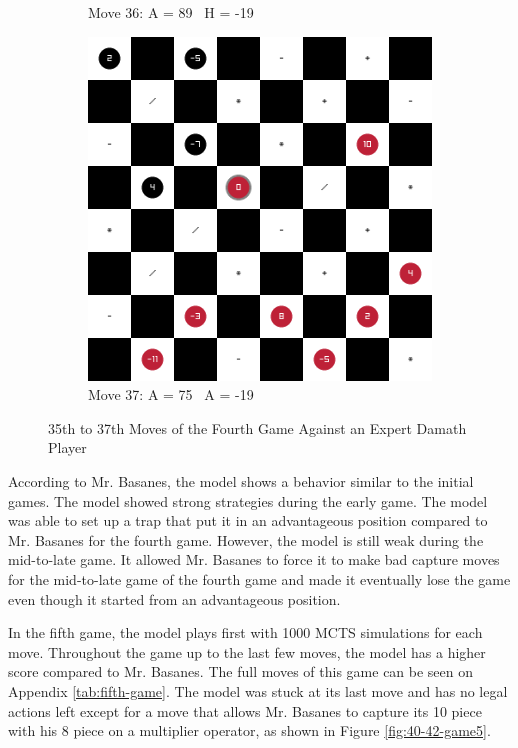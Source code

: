 \begin{figure}[H]
\begin{subfigure}{0.3\textwidth}
        \caption*{Move 36: A = 89 \textbar\ H = -19}
    \end{subfigure}
    \quad
    \begin{subfigure}{0.3\textwidth}
        \centering
        \includegraphics[width=\textwidth]{images/games/game4/move_37.png}
        \caption*{Move 37: A = 75 \textbar\ A = -19}
    \end{subfigure}
    \caption{35th to 37th Moves of the Fourth Game Against an Expert Damath Player}
    \label{fig:35-37-game4}
\end{figure}

According to Mr. Basanes, the model shows a behavior similar to the initial games. The model showed strong strategies during the early game. The model was able to set up a trap that put it in an advantageous position compared to Mr. Basanes for the fourth game. However, the model is still weak during the mid-to-late game. It allowed Mr. Basanes to force it to make bad capture moves for the mid-to-late game of the fourth game and made it eventually lose the game even though it started from an advantageous position.

In the fifth game, the model plays first with 1000 MCTS simulations for each move. Throughout the game up to the last few moves, the model has a higher score compared to Mr. Basanes. The full moves of this game can be seen on Appendix \ref{tab:fifth-game}. The model was stuck at its last move and has no legal actions left except for a move that allows Mr. Basanes to capture its 10 piece with his 8 piece on a multiplier operator, as shown in Figure \ref{fig:40-42-game5}.

